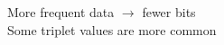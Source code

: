 \documentclass[preview]{standalone}
\begin{document}
More frequent data $\rightarrow$ fewer bits\\Some triplet values are more common\\
\end{document}

